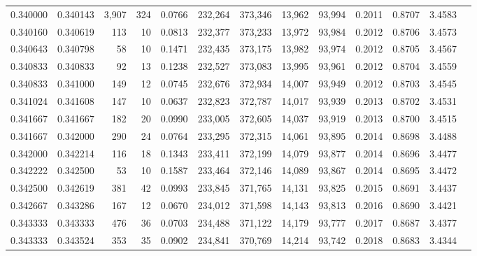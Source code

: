 \begin{tabular}{rrrrrrrrrrrrr}
0.340000 & 0.340143 & 3,907 & 324 &                                     0.0766 & 232,264 & 373,346 &  13,962 &  93,994 & 0.2011 & 0.8707 & 3.4583 \\
0.340160 & 0.340619 &   113 &  10 &                                     0.0813 & 232,377 & 373,233 &  13,972 &  93,984 & 0.2012 & 0.8706 & 3.4573 \\
0.340643 & 0.340798 &    58 &  10 &                                     0.1471 & 232,435 & 373,175 &  13,982 &  93,974 & 0.2012 & 0.8705 & 3.4567 \\
0.340833 & 0.340833 &    92 &  13 &                                     0.1238 & 232,527 & 373,083 &  13,995 &  93,961 & 0.2012 & 0.8704 & 3.4559 \\
0.340833 & 0.341000 &   149 &  12 &                                     0.0745 & 232,676 & 372,934 &  14,007 &  93,949 & 0.2012 & 0.8703 & 3.4545 \\
0.341024 & 0.341608 &   147 &  10 &                                     0.0637 & 232,823 & 372,787 &  14,017 &  93,939 & 0.2013 & 0.8702 & 3.4531 \\
0.341667 & 0.341667 &   182 &  20 &                                     0.0990 & 233,005 & 372,605 &  14,037 &  93,919 & 0.2013 & 0.8700 & 3.4515 \\
0.341667 & 0.342000 &   290 &  24 &                                     0.0764 & 233,295 & 372,315 &  14,061 &  93,895 & 0.2014 & 0.8698 & 3.4488 \\
0.342000 & 0.342214 &   116 &  18 &                                     0.1343 & 233,411 & 372,199 &  14,079 &  93,877 & 0.2014 & 0.8696 & 3.4477 \\
0.342222 & 0.342500 &    53 &  10 &                                     0.1587 & 233,464 & 372,146 &  14,089 &  93,867 & 0.2014 & 0.8695 & 3.4472 \\
0.342500 & 0.342619 &   381 &  42 &                                     0.0993 & 233,845 & 371,765 &  14,131 &  93,825 & 0.2015 & 0.8691 & 3.4437 \\
0.342667 & 0.343286 &   167 &  12 &                                     0.0670 & 234,012 & 371,598 &  14,143 &  93,813 & 0.2016 & 0.8690 & 3.4421 \\
0.343333 & 0.343333 &   476 &  36 &                                     0.0703 & 234,488 & 371,122 &  14,179 &  93,777 & 0.2017 & 0.8687 & 3.4377 \\
0.343333 & 0.343524 &   353 &  35 &                                     0.0902 & 234,841 & 370,769 &  14,214 &  93,742 & 0.2018 & 0.8683 & 3.4344 \\

\end{tabular}
